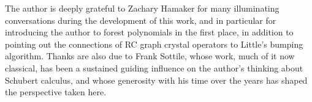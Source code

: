 \documentclass{amsart}
\theoremstyle{definition}
\theoremstyle{remark}
\numberwithin{equation}{subsection}
\begin{document}
The author is deeply grateful to Zachary Hamaker for many illuminating conversations during the development of this work, and in particular for introducing the author to forest polynomials in the first place, in addition to pointing out the connections of RC graph crystal operators to  Little's bumping algorithm. Thanks are also due to Frank Sottile, whose work, much of it now classical, has been a sustained guiding influence on the author's thinking about Schubert calculus, and whose generosity with his time over the years has shaped the perspective taken here.



\end{document}
